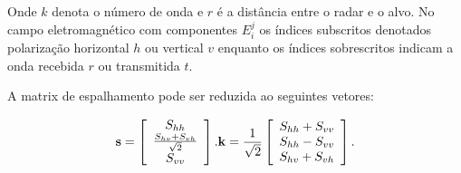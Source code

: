 \documentclass[10pt,a4paper]{article}
\begin{document}
Onde $k$ denota o número de onda e $r$ é a distância entre o radar e o alvo. No campo eletromagnético com componentes $E_{i}^{j}$ os índices subscritos denotados polarização horizontal $h$ ou vertical $v$ enquanto os índices sobrescritos indicam a onda recebida $r$ ou transmitida $t$.    


A matrix de espalhamento pode ser reduzida ao seguintes vetores:

\begin{equation}\label{sec4eqn2}
{\bf s} = \left[
\begin{array}{c}
	S_{hh}      \\
	\frac{S_{hv}+S_{vh}}{\sqrt{2}}     \\
	S_{vv}      \\
\end{array}
\right].
{\bf k} =\frac{1}{\sqrt{2}} \left[
\begin{array}{c}
	S_{hh} + S_{vv}      \\
	S_{hh} - S_{vv}      \\
	S_{hv} + S_{vh}      \\
\end{array}
\right].
\end{equation}



\end{document}
